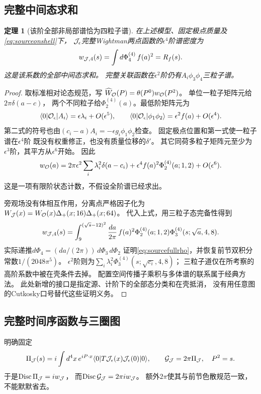 \documentclass[11pt,a4paper]{ctexart}
\theoremstyle{cnplain}\newtheorem{theorem}{定理}[section]
\theoremstyle{definition}\newtheorem{definition}[theorem]{定义}
\theoremstyle{remark}\newtheorem{remark}[theorem]{注}
\begin{document}
\subsection{完整中间态求和}
\begin{theorem}[该阶全部非局部谱恰为四粒子谱]\label{thm:sourcefullspectrum}
在上述模型、固定极点质量及\eqref{eq:sourceonshell}下，
$ {\cal J}_\epsilon$完整Wightman两点函数的$\epsilon^4$阶谱密度为
\begin{equation}\label{eq:sourcefullrho}
 w_{{\cal J},4}(s)=\int d\Phi_4^{(4)}\,f(a)^2=R_f(s).
\end{equation}
这是该系数的全部中间态求和。
完整关联函数在$\epsilon^2$阶仍有$A_i\phi_3\phi_4$三粒子谱。
\end{theorem}
\begin{proof}
取标准相对论态规范，写
$\widehat W_{\cal O}(P)=\theta(P^0)w_{\cal O}(P^2)$。
单位一粒子矩阵元给$2\pi\delta(a-c)$，
两个不同粒子给$\Phi_2^{(4)}(a)$。最低阶矩阵元为
\[
 \langle0|{\cal O}_\epsilon|A_i\rangle=\epsilon\lambda_i+O(\epsilon^5),
 \qquad
 \langle0|{\cal O}_\epsilon|\phi_1\phi_2\rangle
       =\epsilon^2 f(a)+O(\epsilon^4).
\]
第二式的符号也由$(c_i-a)A_i=-\epsilon g_i\phi_1\phi_2$检查。
固定极点位置和第一式使一粒子谱在$\epsilon^4$阶
既没有权重修正，也没有质量位移的$\delta'$。
其它同荷多粒子矩阵元至少为$\epsilon^3$阶，其平方从$\epsilon^6$开始。
因此
\[
 w_{\cal O}(a)=2\pi\epsilon^2\sum_i\lambda_i^2\delta(a-c_i)
 +\epsilon^4 f(a)^2\Phi_2^{(4)}(a;1,2)+O(\epsilon^6).
\]
这是一项有限阶状态计数，不假设全阶谱已经求出。

旁观场没有体相互作用，分离点严格因子化为
$W_{\cal J}(x)=W_{\cal O}(x)\Delta_+(x;16)\Delta_+(x;64)$。
代入上式，用三粒子态完备性得到
\[
 w_{{\cal J},4}(s)=\int_9^{(\sqrt s-12)^2}\frac{da}{2\pi}\,
 f(a)^2\Phi_2^{(4)}(a;1,2)\Phi_3^{(4)}(s;\sqrt a,4,8).
\]
实际递推$d\Phi_4=(da/(2\pi))\,d\Phi_3\,d\Phi_2$
证明\eqref{eq:sourcefullrho}，并恢复前节双积分常数$1/(2048\pi^5)$。
$\epsilon^2$阶则为$\sum_i\lambda_i^2\Phi_3^{(4)}(s;\sqrt{c_i},4,8)$；
三粒子道仅在所考察的高阶系数中被在壳条件去掉。
配置空间传播子乘积与多体谱的联系属于经典方法\cite{GKPsource}。
此处新增的接口是指定源、计阶下的全部态分类和在壳抵消，
没有用任意图的Cutkosky口号替代这些证明义务。
\end{proof}

\subsection{完整时间序函数与三圈图}
明确固定
\[
 \Pi_{\cal J}(s)=i\int d^4x\,e^{iP\cdot x}
 \langle0|T{\cal J}_\epsilon(x){\cal J}_\epsilon(0)|0\rangle,
 \qquad {\cal G}_{\cal J}=2\pi\Pi_{\cal J},\quad P^2=s.
\]
于是$\operatorname{Disc}\Pi_{\cal J}=iw_{\cal J}$，
而$\operatorname{Disc}{\cal G}_{\cal J}=2\pi iw_{\cal J}$。
额外$2\pi$使其与前节色散规范一致，不能默默省去。
\end{document}
